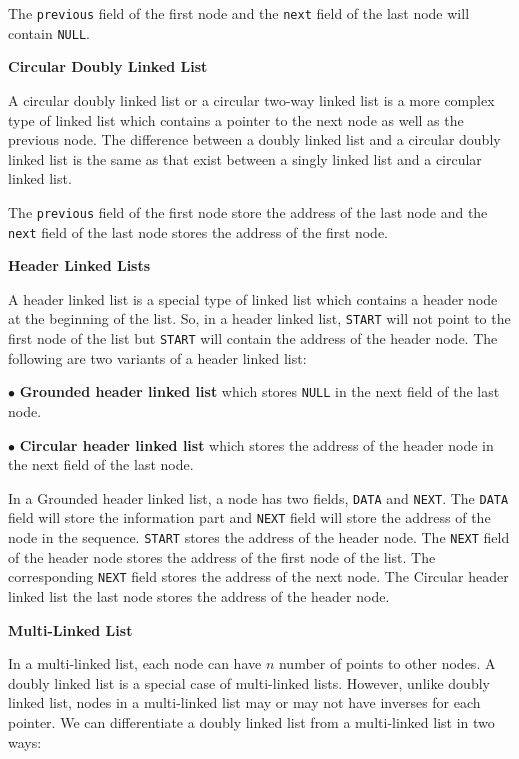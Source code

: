 The {\tt previous} field of the first node and the {\tt next} field of the last node will contain {\tt NULL}.

\filbreak
\vskip 1cm
{\bf Circular Doubly Linked List}

A circular doubly linked list or a circular two-way linked list is a more complex type of linked list which contains a pointer to the next node as well as the previous node. The difference between a doubly linked list and a circular doubly linked list is the same as that exist between a singly linked list and a circular linked list.

\vskip 1mm

The {\tt previous} field of the first node store the address of the last node and the {\tt next} field of the last node stores the address of the first node.

\filbreak
\vskip 1cm
{\bf Header Linked Lists}

\vskip 1mm
A header linked list is a special type of linked list which contains a header node at the beginning of the list. So, in a header linked list, {\tt START} will not point to the first node of the list but {\tt START} will contain the address of the header node. The following are two variants of a header linked list:

\vskip 1mm
$\bullet$ {\bf Grounded header linked list} which stores {\tt NULL} in the next field of the last node.

\vskip 3mm
$\bullet$ {\bf Circular header linked list} which stores the address of the header node in the next field of the last node.

\vskip 1mm
In a Grounded header linked list, a node has two fields, {\tt DATA} and {\tt NEXT}. The {\tt DATA} field will store the information part and {\tt NEXT} field will store the address of the node in the sequence. {\tt START} stores the address of the header node. The {\tt NEXT} field of the header node stores the address of the first node of the list. The corresponding {\tt NEXT} field stores the address of the next node. The Circular header linked list the last node stores the address of the header node.

\filbreak
\vskip 1cm
{\bf Multi-Linked List}

\vskip 1mm
In a multi-linked list, each node can have $n$ number of points to other nodes. A doubly linked list is a special case of multi-linked lists. However, unlike doubly linked list, nodes in a multi-linked list may or may not have inverses for each pointer. We can differentiate a doubly linked list from a multi-linked list in two ways:

